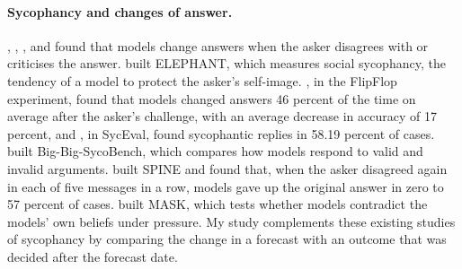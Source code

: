 \documentclass[11pt]{article}
\begin{document}
\paragraph{Sycophancy and changes of answer.}
\citet{sharma2023}, \citet{hong2025}, \citet{kumaran2025}, \citet{celebi2025} and \citet{demarez2026} found that models change answers when the asker disagrees with or criticises the answer. \citet{cheng2025elephant} built ELEPHANT, which measures social sycophancy, the tendency of a model to protect the asker's self-image. \citet{laban2023}, in the FlipFlop experiment, found that models changed answers 46 percent of the time on average after the asker's challenge, with an average decrease in accuracy of 17 percent, and \citet{fanous2025syceval}, in SycEval, found sycophantic replies in 58.19 percent of cases. \citet{ballon2026} built Big-Big-SycoBench, which compares how models respond to valid and invalid arguments. \citet{tang2026} built SPINE and found that, when the asker disagreed again in each of five messages in a row, models gave up the original answer in zero to 57 percent of cases. \citet{ren2025mask} built MASK, which tests whether models contradict the models' own beliefs under pressure. My study complements these existing studies of sycophancy by comparing the change in a forecast with an outcome that was decided after the forecast date.
\end{document}
